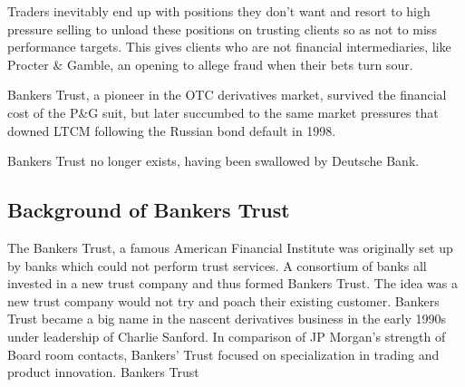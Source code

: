 \documentclass[PRMIA4A.tex]{subfiles}
\begin{document}
Traders inevitably end up with positions they don't want and resort to high pressure selling to unload these positions on trusting clients so as not to miss performance targets.
This gives clients who are not financial intermediaries, like Procter \& Gamble, an opening to allege fraud when their bets turn sour.

Bankers Trust, a pioneer in the OTC derivatives market, survived the financial cost of the P\&G suit, but later succumbed to the same market pressures that downed LTCM following the Russian bond default in 1998.

Bankers Trust no longer exists, having been swallowed by Deutsche Bank.

\subsection{Background of Bankers Trust}
The Bankers Trust, a famous American Financial Institute was originally set up by banks which  could not perform trust services. A consortium of banks all invested in a new trust company and  thus formed Bankers Trust. The idea was a new trust company would not try and poach their  existing customer. Bankers Trust became a big name in the nascent derivatives business in the  early 1990s under leadership of Charlie Sanford. In comparison of JP Morgan’s strength of Board room contacts, Bankers’ Trust focused on specialization in trading and product innovation.
Bankers Trust
\end{document}
